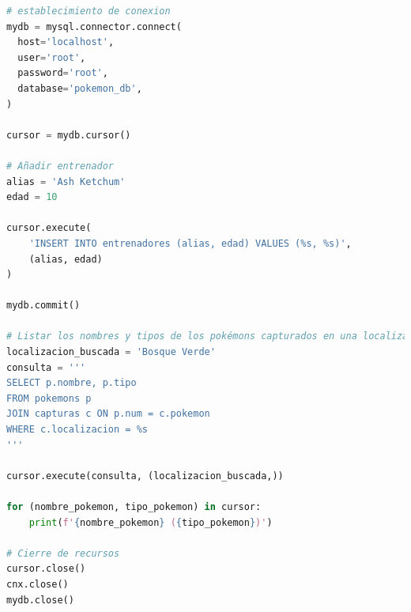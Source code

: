 \documentclass[
    12pt,
    a4paper,
    addpoints,
    answers,
    convocatoria=ext,
    titulacion=CD,
    curso=2023/2024,
]{db-exam}
\begin{document}
\begin{questions}
\begin{parts}
\begin{solution}[1em]
\begin{lstlisting}[language=python]
# establecimiento de conexion
mydb = mysql.connector.connect(
  host='localhost',
  user='root',
  password='root',
  database='pokemon_db',
)

cursor = mydb.cursor()

# Añadir entrenador
alias = 'Ash Ketchum'
edad = 10

cursor.execute(
    'INSERT INTO entrenadores (alias, edad) VALUES (%s, %s)',
    (alias, edad)
)

mydb.commit()

# Listar los nombres y tipos de los pokémons capturados en una localización específica
localizacion_buscada = 'Bosque Verde'
consulta = '''
SELECT p.nombre, p.tipo 
FROM pokemons p
JOIN capturas c ON p.num = c.pokemon
WHERE c.localizacion = %s
'''

cursor.execute(consulta, (localizacion_buscada,))

for (nombre_pokemon, tipo_pokemon) in cursor:
    print(f'{nombre_pokemon} ({tipo_pokemon})')

# Cierre de recursos
cursor.close()
cnx.close()
mydb.close()
\end{lstlisting}
\end{solution}

\end{parts}

\newpage
{}


\end{questions}
\end{document}
